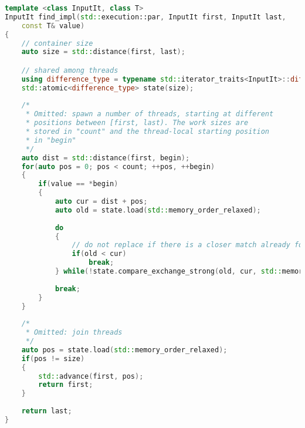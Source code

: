 \begin{lstlisting}[caption={A Microsoft-inspired parallel find implementation},label={lst:find_impl},language=C++]
template <class InputIt, class T>
InputIt find_impl(std::execution::par, InputIt first, InputIt last,
    const T& value)
{
    // container size
    auto size = std::distance(first, last);

    // shared among threads
    using difference_type = typename std::iterator_traits<InputIt>::difference_type;
    std::atomic<difference_type> state(size);
    
    /*
     * Omitted: spawn a number of threads, starting at different
     * positions between [first, last). The work sizes are
     * stored in "count" and the thread-local starting position
     * in "begin"
     */
    auto dist = std::distance(first, begin);
    for(auto pos = 0; pos < count; ++pos, ++begin)
    {
        if(value == *begin)
        {
            auto cur = dist + pos;
            auto old = state.load(std::memory_order_relaxed);
            
            do
            {
                // do not replace if there is a closer match already found
                if(old < cur)
                    break;
            } while(!state.compare_exchange_strong(old, cur, std::memory_order_relaxed));
            
            break;
        }
    }
    
    /*
     * Omitted: join threads
     */
    auto pos = state.load(std::memory_order_relaxed);
    if(pos != size)
    {
        std::advance(first, pos);
        return first;
    }
    
    return last;
}
\end{lstlisting}